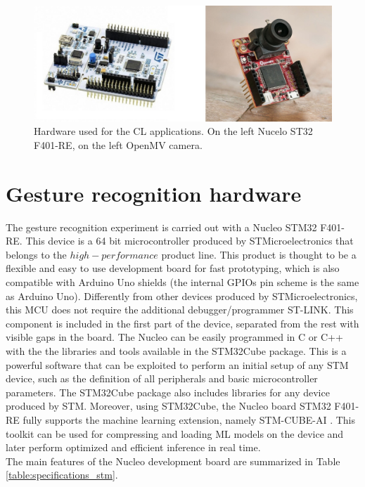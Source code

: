 \documentclass[12pt]{report}
\begin{document}
\begin{figure}[h!]
    \centering
    \includegraphics[width=120mm]{Figures/Chapter2/hardware.jpg} 
    \caption{Hardware used for the CL applications. On the left Nucelo ST32 F401-RE, on the left OpenMV camera.}
    \label{fig:hardware_all}    
\end{figure}

\section{Gesture recognition hardware}
The gesture recognition experiment is carried out with a Nucleo STM32 F401-RE. This device is a 64 bit microcontroller produced by STMicroelectronics that belongs to the $high-performance$ product line. This product is thought to be a flexible and easy to use development board for fast prototyping, which is also compatible with Arduino Uno shields (the internal GPIOs pin scheme is the same as Arduino Uno). Differently from other devices produced by STMicroelectronics, this MCU does not require the additional debugger/programmer ST-LINK. This component is included in the first part of the device, separated from the rest with visible gaps in the board. The Nucleo can be easily programmed in C or C++ with the the libraries and tools available in the STM32Cube package. This is a powerful software that can be exploited to perform an initial setup of any STM device, such as the definition of all peripherals and basic microcontroller parameters. The STM32Cube package also includes libraries for any device produced by STM. Moreover, using STM32Cube, the Nucleo board STM32 F401-RE fully supports the machine learning extension, namely STM-CUBE-AI \autocite{stm_cube_ai}. This toolkit can be used for compressing and loading ML models on the device and later perform optimized and efficient inference in real time. \\
The main features of the Nucleo development board are summarized in Table \ref{table:specifications_stm}.\\
\end{document}
